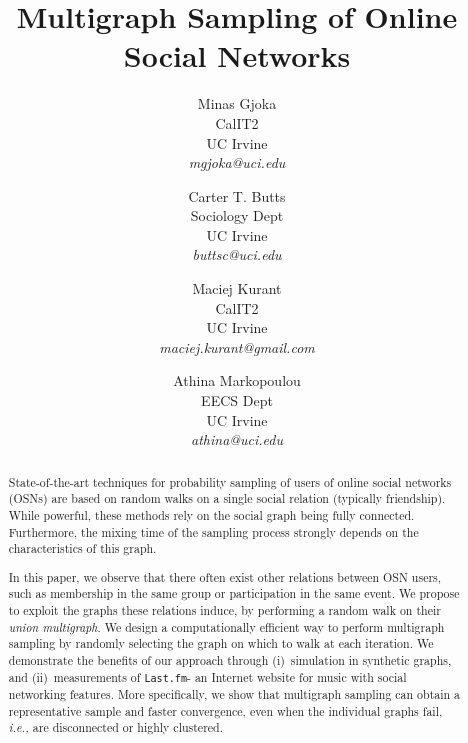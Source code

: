 \documentclass[10pt, conference]{./IEEEtran}
\newcommand{\ie}{{\em i.e., }}
\newcommand{\lastfm}{{\tt Last.fm}\xspace}
\begin{document}
%
%
%
%
%
%
%
%
%
%



\title{Multigraph Sampling of Online Social Networks}
\author{Minas Gjoka\\
CalIT2\\
UC Irvine\\
{\em mgjoka@uci.edu}\\
\and
Carter T. Butts\\
Sociology Dept\\
UC Irvine\\
{\em buttsc@uci.edu}\\
\and
Maciej Kurant\\
CalIT2\\
UC Irvine\\
{\em maciej.kurant@gmail.com}\\
\and
Athina Markopoulou\\
EECS Dept\\
UC Irvine\\
{\em athina@uci.edu}
}

%
%
%
%
%
%
%
%
%
%

\maketitle




\begin{abstract}
State-of-the-art techniques for probability sampling of users of online social networks (OSNs) are based on random walks on a single social relation (typically friendship).  While powerful, these methods rely on the social graph being fully connected. Furthermore, the mixing time of the sampling process strongly depends on the characteristics of this graph.

In this paper, we observe that there often exist other relations between OSN users, such as membership in the same group or participation in the same event. We propose to exploit the graphs these relations induce, by performing a random walk on 
%
their \emph{union multigraph}. %
We design a computationally efficient way to perform multigraph sampling by randomly selecting the graph on which to walk
at each iteration. %
%
We demonstrate the benefits of our approach through (i)~simulation in synthetic graphs, and (ii)~measurements of \lastfm - an Internet website for music with social networking features.
More specifically, we show that multigraph sampling can obtain a representative sample and faster convergence, even when the individual graphs fail, \ie are disconnected or highly clustered.
\end{abstract}
\end{document}
